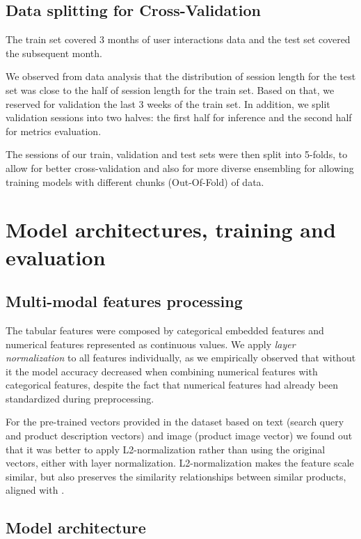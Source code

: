 \documentclass[sigconf,screen]{acmart}
\begin{document}
\subsection{Data splitting for Cross-Validation}
\label{sec:data-split}

The train set covered 3 months of user interactions data and the test set covered the subsequent month.

We observed from data analysis that the distribution of  session length for the test set was close to the half of session length for the train set. Based on that, we reserved for validation the last 3 weeks of the train set. In addition, we split validation  sessions into two halves: the first half for inference and the second half for metrics evaluation.

The sessions of our train, validation and test sets were then split into 5-folds, to allow for better cross-validation and also for more diverse ensembling for allowing training models with different chunks (Out-Of-Fold) of data.

\section{Model architectures, training and evaluation}
\label{sec:model_train_eval}

\subsection{Multi-modal features processing}

The tabular features were composed by categorical embedded features and numerical features represented as continuous values. We apply \emph{layer normalization} \cite{ba2016layer} to all features individually, as we empirically observed that without it the model accuracy decreased when combining numerical features with categorical features, despite the fact that numerical features had already been standardized during preprocessing.

For the pre-trained vectors provided in the dataset based on text (search query and product description vectors) and image (product image vector) we found out that it was better to apply L2-normalization rather than using the original vectors, either with layer normalization. L2-normalization makes the feature scale similar, but also preserves the similarity relationships between similar products, aligned with \cite{moreira2019importance}.

\subsection{Model architecture}
\label{sec:architecture}
\end{document}
